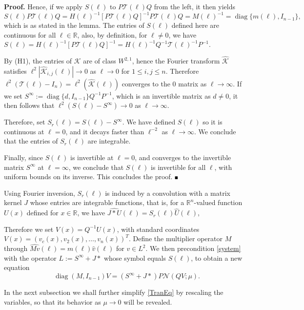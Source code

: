 \documentclass[letterpaper,11pt]{article}
\newcommand{\R}{\mathbb{R}}
\newcommand{\Nl}{\mathcal{N}}
\newcommand{\K}{\mathcal{K}}
\newcommand{\diag}{\operatorname{diag}}
\numberwithin{equation}{section}
\theoremstyle{plain}
\theoremstyle{remark}
\newenvironment{Proof}[1][.]%
 {\begin{trivlist}\item[]\textbf{Proof#1 }}%
 {\hspace*{\fill}$\rule{0.3\baselineskip}{0.35\baselineskip}$\end{trivlist}}
\begin{document}
\begin{Proof}
Hence, if we apply $S(\ell)$ to $P\mathcal{T}(\ell)Q$ from the left, it then yields
 \[
 S(\ell)P\mathcal{T}(\ell)Q = H(\ell)^{-1}[P\mathcal{T}(\ell)Q]^{-1}P\mathcal{T}(\ell)Q = M(\ell)^{-1}=\diag\{m(\ell),I_{n-1}\},
 \]
 which is as stated in the lemma.
 The entries of $S(\ell)$ defined here are continuous for all $\ell \in \R$,  also, by definition, for $\ell\neq 0$, we have $S(\ell) = H(\ell)^{-1}[P\mathcal{T}(\ell)Q]^{-1} = H(\ell)^{-1}Q^{-1}\mathcal{T}(\ell)^{-1}P^{-1}$.
 
By (H1), the entries of $\K$ are of class $W^{2,1}$, hence the Fourier transform $\widehat{\K}$ satisfies $\ell^2|\widehat{\K}_{i,j}(\ell)| \to 0$ as $\ell \to 0$ for $1\le i,j\le n$. Therefore $\ell^2(\mathcal{T}(\ell)-I_n)=\ell^2(\widehat{\K}(\ell))$ converges to the $0$ matrix as $\ell \to 
\infty$. If we set $S^\infty := \diag\{d,I_{n-1}\}Q^{-1}P^{-1}$, which is an invertible matrix as $d\neq 0$, it then follows that $\ell^2(S(\ell)-S^\infty)\to 0$ as $\ell \to \infty$. 

Therefore, set $S_r(\ell) = S(\ell)-S^{\infty}$. We have defined $S(\ell)$ so it is continuous at $\ell=0$, and it decays faster than $\ell^{-2}$ as $\ell \to \infty$. We conclude that the entries of $S_r(\ell)$ are integrable. 

Finally, since $S(\ell)$ is invertible at $\ell =0$, and converges to the invertible matrix $S^\infty$ at $\ell =\infty$, we conclude that  $S(\ell)$ is invertible for all $\ell$, with uniform bounds on its inverse. This concludes the proof.
 \end{Proof}


Using Fourier inversion, $S_r(\ell)$ is induced by a convolution with a matrix kernel $J$ whose entries are integrable functions, that is, for a $\R^n$-valued function $U(x)$ defined for $x\in \R$, we have $\widehat{J \ast U} (\ell) = S_r(\ell)\widehat{U}(\ell)$,

Therefore we set $V(x)=Q^{-1}U(x)$, with standard coordinates $V(x)=(v_c(x),v_2(x),\ldots,v_{n}(x))^T$. Define the multiplier operator $M$ through $\widehat{Mv}(\ell) = m(\ell)\widehat{v}(\ell)$ for $v\in L^2$. We then precondition \eqref{system} with the operator $L := S^{\infty}+J \ast$ whose symbol equals $S(\ell)$, to obtain a new equation
\begin{equation}\label{TranEq}
\diag(M, I_{n-1})V=(S^\infty+J \ast )P\Nl(QV;\mu).
\end{equation}

In the next subsection we shall further simplify \eqref{TranEq} by rescaling the variables, so that its behavior as $\mu \to 0$ will be revealed.
\end{document}
